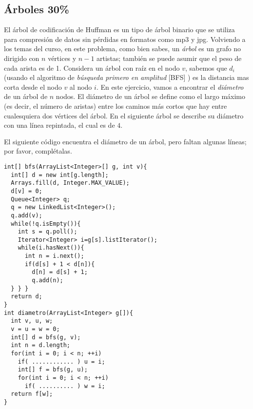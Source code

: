 \documentclass[10 pt]{article}
\begin{document}
\begin{multicols}{2}
\section{Árboles 30\%}
El árbol de codificación de Huffman es un tipo de árbol binario que se utiliza para compresión de datos sin pérdidas en formatos como mp3 y jpg. Volviendo a los temas del curso, en este problema,
como bien sabes, un \emph{árbol} es un grafo no dirigido con $n$ vértices y $n - 1$ artistas; también se puede asumir que el peso de cada arista es de 1. Considera un árbol con raíz en el nodo $v$, sabemos que $d_i$ (usando el algoritmo de \emph{búsqueda primero en amplitud} [BFS] ) es la distancia mas corta desde el nodo $v$ al nodo $i$. En este ejercicio, vamos a encontrar el \textit{diámetro} de un árbol de $n$ nodos. El diámetro de un árbol se define como el largo máximo (es decir, el número de aristas) entre los caminos más cortos que hay entre cualesquiera dos vértices del árbol. En el siguiente árbol se describe su diámetro con una línea repintada, el cual es de $4$.
	\\
\begin{center}
\end{center}
El siguiente código encuentra el diámetro de un árbol, pero faltan algunas líneas; por favor, complétalas.

{\small
\begin{lstlisting}
int[] bfs(ArrayList<Integer>[] g, int v){
  int[] d = new int[g.length];
  Arrays.fill(d, Integer.MAX_VALUE);
  d[v] = 0;
  Queue<Integer> q;
  q = new LinkedList<Integer>();
  q.add(v);
  while(!q.isEmpty()){
    int s = q.poll();
    Iterator<Integer> i=g[s].listIterator();
    while(i.hasNext()){
      int n = i.next();
      if(d[s] + 1 < d[n]){
        d[n] = d[s] + 1;
        q.add(n);
  } } }
  return d;
}
int diametro(ArrayList<Integer> g[]){
  int v, u, w;
  v = u = w = 0;
  int[] d = bfs(g, v);
  int n = d.length;
  for(int i = 0; i < n; ++i)
    if( ............ ) u = i;
    int[] f = bfs(g, u);
    for(int i = 0; i < n; ++i)
      if( .......... ) w = i;
  return f[w];
}
\end{lstlisting}
}


\end{multicols}
\end{document}
